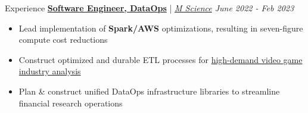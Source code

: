 \documentclass{content/resume/resume}
\begin{document}
\begin{rSection}{Experience}
  \href{https://www.linkedin.com/posts/m-science-llc_how-m-science-uses-databricks-structured-activity-6953752015013363713-EOTN/}{\bf Software Engineer, DataOps} | {\em \href{https://mscience.com}{M Science} \hfill June 2022 - Feb 2023}
  \vspace{-6pt}
  \begin{itemize}[nosep]
    \item Lead implementation of {\bf Spark/AWS} optimizations, resulting in seven-figure compute cost reductions
    \item Construct optimized and durable ETL processes for \href{https://mscience.com/blog/?topics=223%2C223}{high-demand video game industry analysis}
    \item Plan \& construct unified DataOps infrastructure libraries to streamline financial research operations
  \end{itemize}
  

\end{rSection}
\end{document}
